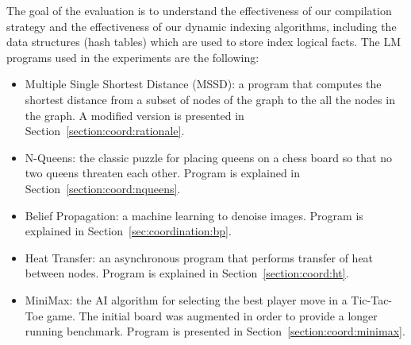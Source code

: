 The goal of the evaluation is to understand the effectiveness of our compilation
strategy and the effectiveness of our dynamic indexing algorithms, including the
data structures (hash tables) which are used to store index logical facts. The
LM programs used in the experiments are the following:

\begin{itemize}
   \item Multiple Single Shortest Distance (MSSD): a program that computes the
      shortest distance from a subset of nodes of the graph to the all the nodes
      in the graph. A modified version is presented in
      Section~\ref{section:coord:rationale}.

   \item N-Queens: the classic puzzle for placing queens on a chess board so
      that no two queens threaten each other. Program is explained in
      Section~\ref{section:coord:nqueens}.

   \item Belief Propagation: a machine learning to denoise images. Program is
      explained in Section~\ref{sec:coordination:bp}.

    \item Heat Transfer: an asynchronous program that performs transfer of heat
       between nodes. Program is explained in Section~\ref{section:coord:ht}.

    \item MiniMax: the AI algorithm for selecting the best player move in a
       Tic-Tac-Toe game. The initial board was augmented in order to provide a
       longer running benchmark. Program is presented in
       Section~\ref{section:coord:minimax}.
\end{itemize}

